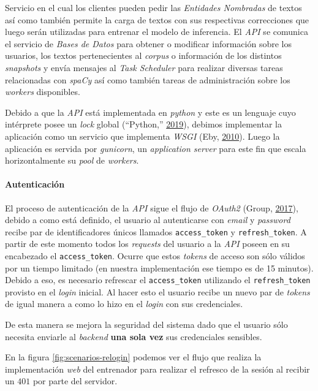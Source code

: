 \documentclass[12pt,a4paper,]{scrartcl}
\let\oldparagraph\paragraph
\renewcommand{\paragraph}[1]{\oldparagraph{#1}\mbox{}}
\begin{document}
Servicio en el cual los clientes pueden pedir las \emph{Entidades Nombradas} de textos así como también permite la carga de textos con sus respectivas correcciones que luego serán utilizadas para entrenar el modelo de inferencia.
El \emph{API} se comunica el servicio de \emph{Bases de Datos} para obtener o modificar información sobre los usuarios, los textos pertenecientes al \emph{corpus} o información de los distintos \emph{snapshots} y envía mensajes al \emph{Task Scheduler} para realizar diversas tareas relacionadas con \emph{spaCy} así como también tareas de administración sobre los \emph{workers} disponibles.

Debido a que la \emph{API} está implementada en \emph{python} y este es un lenguaje cuyo intérprete posee un \emph{lock} global (``Python,'' \protect\hyperlink{ref-python_gil}{2019}), debimos implementar la aplicación como un servicio que implementa \emph{WSGI} (Eby, \protect\hyperlink{ref-pep-3333}{2010}). Luego la aplicación es servida por \emph{gunicorn}, un \emph{application server} para este fin que escala horizontalmente su \emph{pool} de \emph{workers}.

\hypertarget{autenticaciuxf3n-1}{%
\paragraph{Autenticación}\label{autenticaciuxf3n-1}}

El proceso de autenticación de la \emph{API} sigue el flujo de \emph{OAuth2} (Group, \protect\hyperlink{ref-oauth2}{2017}), debido a como está definido, el usuario al autenticarse con \emph{email} y \emph{password} recibe par de identificadores únicos llamados \texttt{access\_token} y \texttt{refresh\_token}. A partir de este momento todos los \emph{requests} del usuario a la \emph{API} poseen en su encabezado el \texttt{access\_token}. Ocurre que estos \emph{tokens} de acceso son sólo válidos por un tiempo limitado (en nuestra implementación ese tiempo es de 15 minutos). Debido a eso, es necesario refrescar el \texttt{access\_token} utilizando el \texttt{refresh\_token} provisto en el \emph{login} inicial. Al hacer esto el usuario recibe un nuevo par de \emph{tokens} de igual manera a como lo hizo en el \emph{login} con sus credenciales.

De esta manera se mejora la seguridad del sistema dado que el usuario sólo necesita enviarle al \emph{backend} \textbf{una sola vez} sus credenciales sensibles.

En la figura \ref{fig:scenarios-relogin} podemos ver el flujo que realiza la implementación \emph{web} del entrenador para realizar el refresco de la sesión al recibir un \(401\) por parte del servidor.
\end{document}
